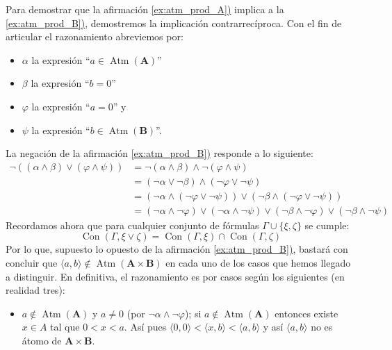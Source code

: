\begin{solution}
  Para demostrar que la afirmación \hyperref[ex:atm_prod_A]{\ref*{ex:atm_prod_A})}
  implica a la \hyperref[ex:atm_prod_B]{\ref*{ex:atm_prod_B})},
  demostremos la implicación contrarrecíproca. Con el fin de articular
  el razonamiento abreviemos por:
  \begin{itemize}
  \item $\alpha$ la expresión ``$a\in
    \operatorname{Atm}(\mathbf{A})$''
  \item $\beta$ la expresión ``$b=0$''
  \item $\varphi$ la expresión ``$a=0$'' y
  \item $\psi$ la expresión
    ``$b\in \operatorname{Atm}(\mathbf{B})$''.
  \end{itemize}
  La negación de la afirmación
  \hyperref[ex:atm_prod_B]{\ref*{ex:atm_prod_B})} responde a lo
  siguiente:
  \begin{align*}
    \neg((\alpha\wedge\beta)\vee (\varphi\wedge\psi))&=
        \neg(\alpha\wedge\beta)\wedge\neg (\varphi\wedge\psi)\\
    &=(\neg\alpha\vee\neg\beta)\wedge(\neg\varphi\vee\neg\psi)\\
    &=(\neg\alpha\wedge(\neg\varphi\vee\neg\psi))
    \vee (\neg\beta\wedge(\neg\varphi\vee\neg\psi))\\
    &=(\neg\alpha\wedge\neg\varphi)\vee(\neg\alpha\wedge\neg\psi)
    \vee(\neg\beta\wedge\neg\varphi)\vee(\neg\beta\wedge\neg\psi)
  \end{align*}
Recordamos ahora que para cualquier conjunto de fórmulas
$\Gamma\cup\{\xi,\zeta\}$ se cumple: 
\begin{equation*}
 \operatorname{Con}(\Gamma,\xi\vee\zeta)=
\operatorname{Con}(\Gamma,\xi)\cap\operatorname{Con}(\Gamma,\zeta) 
\end{equation*}
Por lo que, supuesto lo opuesto de la afirmación
\hyperref[ex:atm_prod_B]{\ref*{ex:atm_prod_B})}, bastará con concluir
que
$\langle a,b\rangle\notin
\operatorname{Atm}(\mathbf{A}\times\mathbf{B})$ en cada uno de los
casos que hemos llegado a distinguir. En definitiva, el razonamiento
es por casos según los siguientes (en realidad tres):
\begin{itemize}
\item $a\notin\operatorname{Atm}(\mathbf{A})$ y $a\neq 0$ (por
  $\neg\alpha\wedge\neg\varphi$); si
  $a\notin\operatorname{Atm}(\mathbf{A})$ entonces existe $x\in A$ tal
  que $0<x<a$. Así pues
  $\langle 0,0\rangle<\langle x,b\rangle<\langle a,b\rangle$ y
  así $\langle a,b\rangle$ no es átomo de $\mathbf{A}\times\mathbf{B}$.

\end{itemize}
\end{solution}
